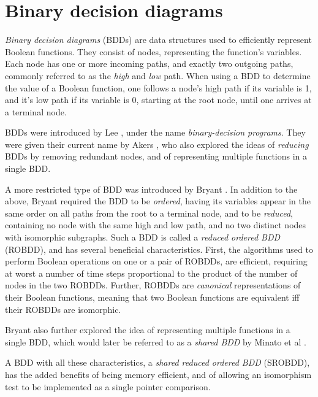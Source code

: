\documentclass[a4paper,11pt]{kth-mag}
\begin{document}
\cite{crick_thesis}

\cite{aha}
\cite{pic}

\section{Binary decision diagrams}

\emph{Binary decision diagrams} (BDDs) are data structures used to efficiently represent Boolean functions.
They consist of nodes, representing the function's variables. Each node has one or more incoming paths, and exactly two outgoing paths, commonly referred to as the \emph{high} and \emph{low} path.
When using a BDD to determine the value of a Boolean function, one follows a node's high path if its variable is 1, and it's low path if its variable is 0, starting at the root node, until one arrives at a terminal node.

BDDs were introduced by Lee \cite{lee59}, under the name \emph{binary-decision programs}.
They were given their current name by Akers \cite{akers78}, who also explored the ideas of \emph{reducing} BDDs by removing redundant nodes, and of representing multiple functions in a single BDD.

A more restricted type of BDD was introduced by Bryant \cite{bryant86}.
In addition to the above, Bryant required the BDD to be \emph{ordered}, having its variables appear in the same order on all paths from the root to a terminal node,
and to be \emph{reduced}, containing no node with the same high and low path, and no two distinct nodes with isomorphic subgraphs.
Such a BDD is called a \emph{reduced ordered BDD} (ROBDD), and has several beneficial characteristics.
First, the algorithms used to perform Boolean operations on one or a pair of ROBDDs, are efficient, requiring at worst a number of time steps proportional to the product of the number of nodes in the two ROBDDs.
Further, ROBDDs are \emph{canonical} representations of their Boolean functions, meaning that two Boolean functions are equivalent iff their ROBDDs are isomorphic.

Bryant also further explored the idea of representing multiple functions in a single BDD, which would later be referred to as a \emph{shared BDD} by Minato et al \cite{minato90}.

A BDD with all these characteristics, a \emph{shared reduced ordered BDD} (SROBDD), has the added benefits of being memory efficient, and of allowing an isomorphism test to be implemented as a single pointer comparison.
\end{document}
